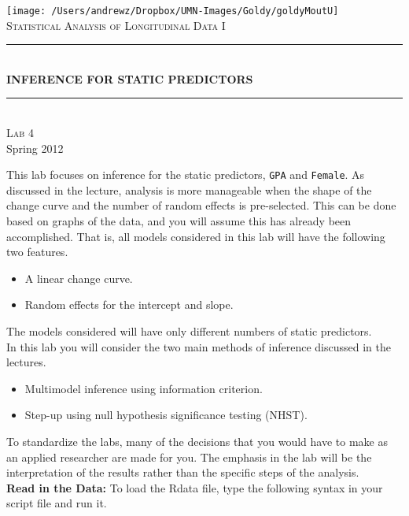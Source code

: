 \documentclass[]{article}
\title{}
\author{}
\date{}
\newcommand{\HRule}{\rule{\linewidth}{0.5mm}}
\begin{document}
\thispagestyle{empty}


\begin{titlepage}
\begin{center}
\texttt{[image: /Users/andrewz/Dropbox/UMN-Images/Goldy/goldyMoutU]}\\[1cm]    
\textsc{\LARGE Statistical Analysis of Longitudinal Data I}\\[1.5cm]
\HRule \\[.5cm]
{ \huge \bfseries INFERENCE FOR STATIC PREDICTORS}\\[0.4cm]
\HRule \\[1.5cm]
\textsc{\Large Lab 4}\\[0.5cm]
\vfill
{\large Spring 2012}

\end{center}
\end{titlepage}

\thispagestyle{fancy}
\setlength{\textheight}{8.5in}


\noindent This lab focuses on inference for the static predictors, \texttt{GPA} and \texttt{Female}. As
discussed in the lecture, analysis is more manageable when the shape of the change curve and the number of random effects is pre-selected. This can be done based on graphs of the data, and you will assume this has already been accomplished. That is, all models considered in this lab will have the following two features.
\begin{itemize}
\item A linear change curve.
\item Random effects for the intercept and slope.
\end{itemize}
The models considered will have only different numbers of static predictors. \\
\linebreak
\noindent In this lab you will consider the two main methods of inference discussed in the lectures.
\begin{itemize}
\item Multimodel inference using information criterion.
\item Step-up using null hypothesis significance testing (NHST).
\end{itemize}
To standardize the labs, many of the decisions that you would have to make as an applied researcher are made for you. The emphasis in the lab will be the interpretation of the results rather than the specific steps of the analysis.\\
\linebreak
\noindent\textbf{Read in the Data:} To load the Rdata file, type the following syntax in your script file and run it.
\end{document}
